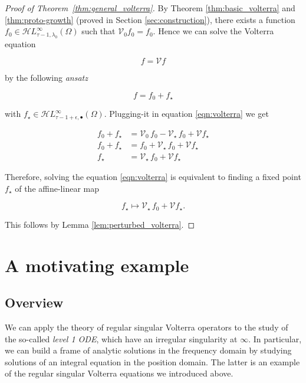 \documentclass{article}
\theoremstyle{plain}
\newcommand{\singexp}[2]{\mathcal{H}L^\infty_{#1, #2}}
\newcommand{\singexpalg}[1]{\singexp{#1}{\bullet}}
\newcommand{\volterra}{\mathcal{V}}
\newcommand{\hardpart}{\mathcal{V}_0}
\newcommand{\softpart}{\mathcal{V}_\star}
\newcommand{\hardker}{k_0}
\begin{document}
\begin{proof}[Proof of Theorem~\ref{thm:general_volterra}]
By Theorem \ref{thm:basic_volterra} and \ref{thm:proto-growth} (proved in Section \ref{sec:construction}), there exists a function $f_0\in \singexp{\tau-1}{\lambda_0}(\Omega)$ such that $\hardpart f_0= f_0$. Hence we can solve the Volterra equation 

\begin{equation}\label{eqn:volterra}
    f = \volterra f
\end{equation} 

by the following \textit{ansatz}

\[ f= f_0 + f_\star\]

with $f_\star\in\singexpalg{\tau-1+\epsilon}(\Omega)$. Plugging-it in equation \eqref{eqn:volterra} we get 

\begin{align*}
    f_0 + f_\star & = \hardpart\,f_0 - \softpart \,f_0 + \volterra f_\star \\
f_0 + f_\star & = f_0 + \softpart \,f_0 + \volterra f_\star \\
f_\star & = \softpart \,f_0 + \volterra f_\star
\end{align*}

Therefore, solving the equation \eqref{eqn:volterra} is equivalent to finding a fixed point $f_\star$ of the affine-linear map

\[ f_\star \mapsto \softpart\,f_0 + \volterra f_\star. \]

This follows by Lemma \ref{lem:perturbed_volterra}.
\end{proof}


\section{A motivating example}\label{sec:example}
\subsection{Overview}

We can apply the theory of regular singular Volterra operators to the study of the so-called \textit{level 1 ODE}, which have an irregular singularity at $\infty$. In particular, we can build a frame of analytic solutions in the frequency domain by studying solutions of an integral equation in the position domain. The latter is an example of the regular singular Volterra equations we introduced above.    
\end{document}
